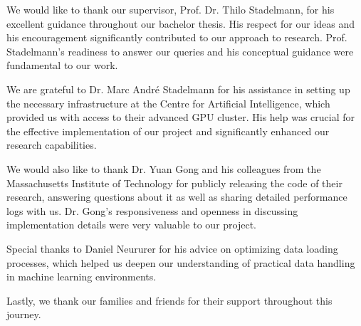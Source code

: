 We would like to thank our supervisor, Prof. Dr. Thilo Stadelmann, for his excellent guidance throughout our bachelor thesis. His respect for our ideas and his encouragement significantly contributed to our approach to research. Prof. Stadelmann's readiness to answer our queries and his conceptual guidance were fundamental to our work.

We are grateful to Dr. Marc André Stadelmann for his assistance in setting up the necessary infrastructure at the Centre for Artificial Intelligence, which provided us with access to their advanced GPU cluster. His help was crucial for the effective implementation of our project and significantly enhanced our research capabilities.

We would also like to thank Dr. Yuan Gong and his colleagues from the Massachusetts Institute of Technology for publicly releasing the code of their research, answering questions about it as well as sharing detailed performance logs with us. Dr. Gong's responsiveness and openness in discussing implementation details were very valuable to our project.

Special thanks to Daniel Neururer for his advice on optimizing data loading processes, which helped us deepen our understanding of practical data handling in machine learning environments.

Lastly, we thank our families and friends for their support throughout this journey.